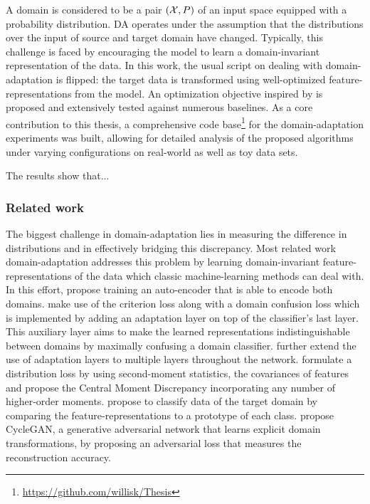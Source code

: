 A domain is considered to be a pair $(\mathcal X, P)$ of an input space equipped with a probability distribution. DA operates under the assumption that the distributions over the input of source and target domain have changed.
Typically, this challenge is faced by encouraging the model to learn a domain-invariant
representation of the data.
In this work, the usual script on dealing with domain-adaptation is flipped: 
the target data is transformed using well-optimized feature-representations from the model. 
An optimization objective inspired by \cite{DeepInversion} is proposed and
extensively tested against numerous baselines.
As a core contribution to this thesis, a comprehensive code
base\footnote{\url{https://github.com/willisk/Thesis}} for the domain-adaptation experiments 
was built, 
allowing for detailed analysis of the proposed algorithms under varying configurations 
on real-world as well as toy data sets.

The results show that...


\subsubsection{Related work}

The biggest challenge in domain-adaptation lies in measuring the difference in distributions
and in effectively bridging this discrepancy.
Most related work domain-adaptation 
addresses this problem by learning domain-invariant feature-representations of the data
which classic machine-learning methods can deal with.
In this effort, \cite{DA_AE} propose training an auto-encoder that is able to encode both domains.
\cite{DA_Deep_Transfer} make use of the criterion loss along with a domain confusion loss 
which is implemented by adding an adaptation layer on top of the classifier's last layer.
This auxiliary layer aims to make the learned representations indistinguishable 
between domains by maximally confusing a domain classifier.
\cite{DA_MMD} further extend the use of adaptation layers to multiple layers throughout the network.
\cite{Deep_Coral} formulate a distribution loss by using second-moment statistics, the covariances of features and
\cite{DA_CMD} propose the Central Moment Discrepancy incorporating any number of higher-order moments.
\cite{DA_Prototypes} propose to classify data of the target domain by comparing 
the feature-representations to a prototype of each class.
\cite{DA_CycleGAN} propose CycleGAN, a generative adversarial network that learns 
explicit domain transformations, by proposing an adversarial loss
that measures the reconstruction accuracy.


